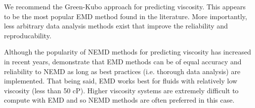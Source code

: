 \documentclass[9pt]{livecoms}
\begin{document}


We recommend the Green-Kubo approach for predicting viscosity. This appears to be the most popular EMD method found in the literature. More importantly, less arbitrary data analysis methods exist that improve the reliability and reproducability. 

Although the popularity of NEMD methods for predicting viscosity has increased in recent years, \cite{Chen2009} demonstrate that EMD methods can be of equal accuracy and reliability to NEMD as long as best practices (i.e. thorough data analysis) are implemented. That being said, EMD works best for fluids with relatively low viscosity (less than 50 cP). Higher viscosity systems are extremely difficult to compute with EMD and so NEMD methods are often preferred in this case.
\end{document}
